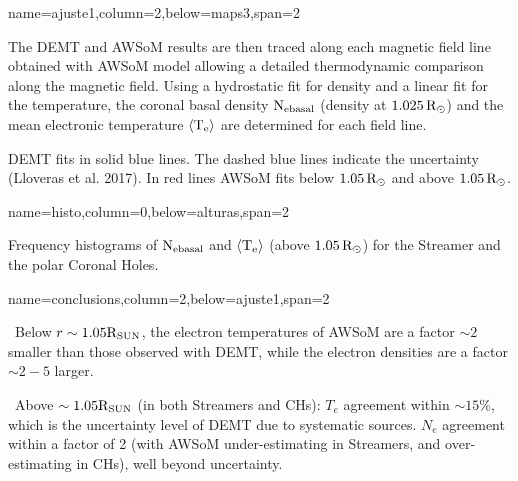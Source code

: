 \documentclass[paperwidth=100cm,paperheight=120cm]{baposter}
\def\bu{\textcolor{red}{\textbullet~}}
\def\bu{\textcolor{red}{\textbullet~}}
\def\azul#1{\textcolor{blue}{#1}}
\begin{document}
\begin{poster}
{name=ajuste1,column=2,below=maps3,span=2}{
{\footnotesize\sf
The DEMT and AWSoM results are then traced along each magnetic field line obtained with AWSoM model allowing a detailed thermodynamic comparison along the magnetic field. Using a hydrostatic fit for density and a linear fit for the temperature, the coronal basal density ${\rm N_{e basal}}$ (density at $1.025 \, {\rm R}_\odot$) and the mean electronic temperature ${\langle \rm T_e \rangle}$ are determined for each field line.
\begin{center}
\end{center}
DEMT fits in solid blue lines. The dashed blue lines indicate the uncertainty (Lloveras {\rm et al.} 2017). In red lines AWSoM fits below $1.05 \, {\rm R}_\odot$ and above $1.05 \, {\rm R}_\odot$.

}
}

{name=histo,column=0,below=alturas,span=2}{
{\footnotesize\sf
\begin{center}
\end{center}
\vskip -0.16cm
Frequency histograms of ${\rm N_{e basal}}$ and ${\rm \langle T_e \rangle}$ (above $1.05 \, {\rm R}_\odot$) for the Streamer and the polar Coronal Holes.

}
}

{name=conclusions,column=2,below=ajuste1,span=2}{
{\footnotesize\sf
\bu Below $r \sim 1.05 {\rm R_{SUN}}$, the electron temperatures of AWSoM are a factor $\sim 2$ smaller than those observed with DEMT, while the electron densities are a factor $\sim 2-5$ larger.

\bu Above $\sim 1.05 {\rm R_{SUN}}$ (in both Streamers and CHs): $T_e$ agreement within $\sim 15 \%$, which is the uncertainty level of DEMT due to systematic sources. $N_e$ agreement within a factor of 2 (with AWSoM under-estimating in Streamers, and over-estimating in CHs), well beyond uncertainty.

}}
\end{poster}
\end{document}
